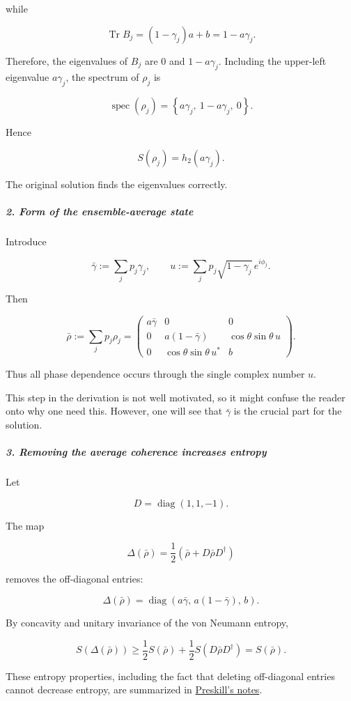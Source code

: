 while

\[
\operatorname{Tr}B_j=(1-\gamma_j)a+b=1-a\gamma_j.
\]

Therefore, the eigenvalues of $B_j$ are $0$ and $1-a\gamma_j$. Including the upper-left eigenvalue $a\gamma_j$, the spectrum of $\rho_j$ is

\[
\operatorname{spec}(\rho_j) = \left\{a\gamma_j,\ 1-a\gamma_j,\ 0\right\}.
\]

Hence

\[
S(\rho_j)=h_2(a\gamma_j).
\]

{
\color{blue}
The original solution finds the eigenvalues correctly.
}

\subparagraph*{2. Form of the ensemble-average state}

Introduce

\[
\bar\gamma:=\sum_jp_j\gamma_j, \qquad u:=\sum_jp_j\sqrt{1-\gamma_j}\,e^{i\phi_j}.
\]

Then

\[
\bar\rho:=\sum_jp_j\rho_j
=
\begin{pmatrix}
a\bar\gamma&0&0\\
0&a(1-\bar\gamma)&\cos\theta\sin\theta\,u\\
0&\cos\theta\sin\theta\,u^*&b
\end{pmatrix}.
\]

Thus all phase dependence occurs through the single complex number $u$.

{
\color{blue}
This step in the derivation is not well motivated, so it might confuse the reader onto why one need this. However, one will see that $\bar\gamma$ is the crucial part for the solution. 
}

\subparagraph*{3. Removing the average coherence increases entropy}

Let

\[
D=\operatorname{diag}(1,1,-1).
\]

The map

\[
\Delta(\bar\rho) = \frac{1}{2}\left(\bar\rho+D\bar\rho D^\dagger\right)
\]

removes the off-diagonal entries:

\[
\Delta(\bar\rho) = \operatorname{diag}\left( a\bar\gamma,\, a(1-\bar\gamma),\, b \right).
\]

By concavity and unitary invariance of the von Neumann entropy,

\[
S(\Delta(\bar\rho)) \geq \frac12S(\bar\rho)+\frac12S(D\bar\rho D^\dagger) =S(\bar\rho).
\]

These entropy properties, including the fact that deleting off-diagonal entries cannot decrease entropy, are summarized in \href{\detokenize{https://www.preskill.caltech.edu/ph229/notes/chap5.pdf}}{Preskill's notes}.

